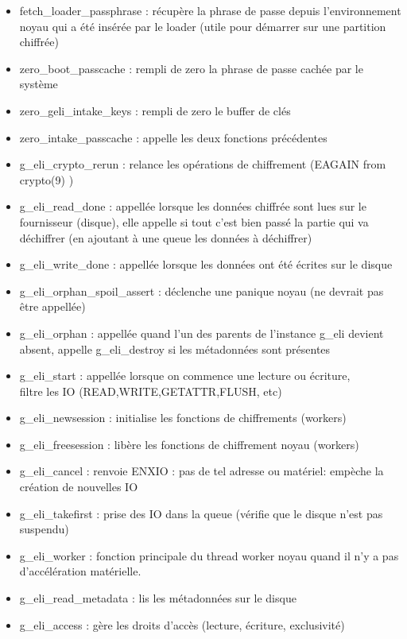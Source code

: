 \begin{itemize}
	\item fetch\_loader\_passphrase : récupère la phrase de passe depuis 
		l'environnement noyau qui a été insérée par le loader 
		(utile pour démarrer sur une partition chiffrée)
	\item zero\_boot\_passcache : rempli de zero la phrase de passe cachée par le 
		système
	\item zero\_geli\_intake\_keys : rempli de zero le buffer de clés
	\item zero\_intake\_passcache : appelle les deux fonctions précédentes
	\item g\_eli\_crypto\_rerun : relance les opérations de chiffrement (EAGAIN from
		crypto(9) )
	\item g\_eli\_read\_done : appellée lorsque les données chiffrée sont lues sur le 
		fournisseur (disque), elle appelle si tout c'est bien passé la partie
		qui va déchiffrer (en ajoutant à une queue les données à déchiffrer)
	\item g\_eli\_write\_done : appellée lorsque les données ont été écrites sur le 
		disque
	\item g\_eli\_orphan\_spoil\_assert : déclenche une panique noyau (ne devrait pas
		être appellée)
	\item g\_eli\_orphan : appellée quand l'un des parents de l'instance g\_eli 
		devient absent, appelle g\_eli\_destroy si les métadonnées sont présentes
	\item g\_eli\_start : appellée lorsque on commence une lecture ou écriture, \\
		filtre les IO (READ,WRITE,GETATTR,FLUSH, etc)
	\item g\_eli\_newsession : initialise les fonctions de chiffrements (workers)
	\item g\_eli\_freesession : libère les fonctions de chiffrement noyau (workers)
	\item g\_eli\_cancel : renvoie ENXIO : pas de tel adresse ou matériel: empèche
		la création de nouvelles IO
	\item g\_eli\_takefirst : prise des IO dans la queue (vérifie que le disque n'est
		pas suspendu)
	\item g\_eli\_worker : fonction principale du thread worker noyau quand il n'y a
		pas d'accélération matérielle.
	\item g\_eli\_read\_metadata : lis les métadonnées sur le disque
	\item g\_eli\_access : gère les droits d'accès (lecture, écriture, exclusivité)

\end{itemize}
